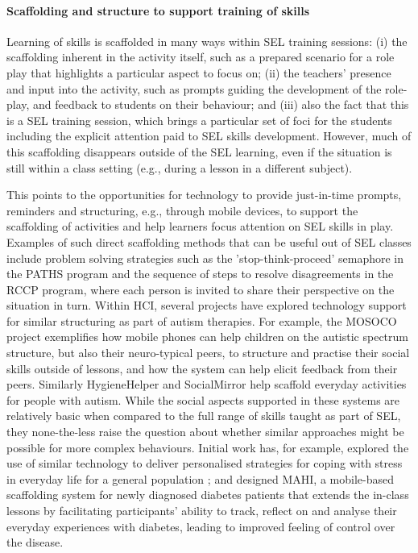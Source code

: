\documentclass[prodmode,acmtochi]{acmsmall}
\begin{document}
\paragraph{Scaffolding and structure to support training of skills}
Learning of skills is scaffolded in many ways within SEL training sessions:  (i) the scaffolding inherent in the activity itself, such as a prepared scenario for a role play that highlights a particular aspect to focus on; (ii) the teachers' presence and input into the activity, such as prompts guiding the development of the role-play, and feedback to students on their behaviour; and (iii) also the fact that this is a SEL training session, which brings a particular set of foci for the students including the explicit attention paid to SEL skills development. However, much of this scaffolding disappears outside of the SEL learning, even if the situation is still within a class setting (e.g., during a lesson in a different subject). 


This points to the opportunities for technology to provide just-in-time prompts, reminders and structuring, e.g.,  through mobile devices, to support the scaffolding of activities and help learners focus attention on SEL skills in play. 
%
Examples of such direct scaffolding methods that can be useful out of SEL classes include problem solving strategies such as the 'stop-think-proceed' semaphore in the PATHS program and the sequence of steps to resolve disagreements in the RCCP program, where each person is invited to share their perspective on the situation in turn. Within HCI, several projects have explored technology support for similar structuring as part of autism therapies. For example, the MOSOCO project \cite{Escobedo2012,Tentori2010} exemplifies how mobile phones can help children on the autistic spectrum structure, but also their neuro-typical peers, to structure and practise their social skills outside of lessons, and how the system can help elicit feedback from their peers. Similarly HygieneHelper \cite{Hayes2013} and SocialMirror \cite{Hong2012} help scaffold everyday activities for people with autism. While the social aspects supported in these systems are relatively basic when compared to the full range of skills taught as part of SEL, they none-the-less raise the question about whether similar approaches might be possible for more complex behaviours. Initial work has, for example, explored the use of similar technology to deliver personalised strategies for coping with stress in everyday life for a general population \cite{Paredes2014}; and  designed MAHI, a mobile-based scaffolding system for newly diagnosed diabetes patients that extends the in-class lessons by facilitating participants' ability to track, reflect on and analyse their everyday experiences with diabetes, leading to improved feeling of control over the disease.
\end{document}
